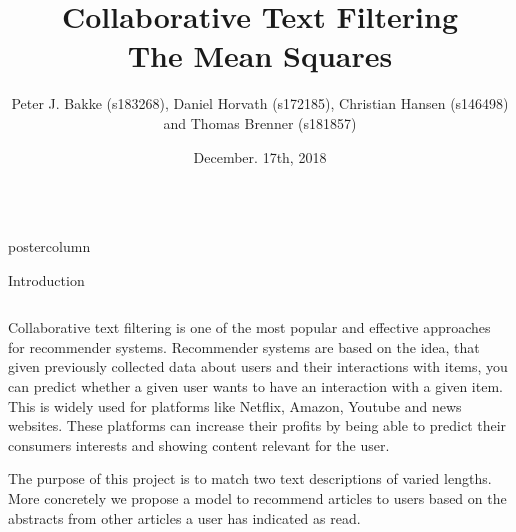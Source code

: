 \documentclass[final,hyperref={pdfpagelabels=false}]{beamer}
\title{
\huge Collaborative Text Filtering \\
\Large The Mean Squares
}
\author{Peter J. Bakke (s183268), Daniel Horvath (s172185), Christian Hansen (s146498) and Thomas Brenner (s181857)}
\institute[Department]{\small DTU Compute, Technical University of Denmark}
\date[December. 17th, 2018]{December. 17th, 2018}
\newlength{\columnheight}
\begin{document}
\begin{frame}
 \begin{columns}
 \begin{column}{.49\paperwidth}
 \begin{beamercolorbox}[center,wd=\textwidth]{postercolumn}
 \begin{minipage}[T]{.99\textwidth}  %
 \parbox[t][\columnheight]{\textwidth}{ %

\begin{block}{Introduction}
 \begin{columns}
 \begin{column}{1\textwidth}



\centering
\begin{minipage}[t]{0.98\textwidth}

\footnotesize{Collaborative text filtering is one of the most popular and effective approaches for recommender systems. Recommender systems are based on the idea, that given previously collected data about users and their interactions with items, you can predict whether a given user wants to have an interaction with a given item. This is widely used for platforms like Netflix, Amazon, Youtube and news websites. These platforms can increase their profits by being able to predict their consumers interests and showing content relevant for the user. 

The purpose of this project is to match two text descriptions of varied lengths. More concretely we propose a model to recommend articles to users based on the abstracts from other articles a user has indicated as read.
\vspace{0.5cm}
}



\end{minipage} \hspace{1cm}


      
\end{column}
 \end{columns}
 \end{block}
 \vfill


}
\end{minipage}
\end{beamercolorbox}
\end{column}
\end{columns}
\end{frame}
\end{document}
